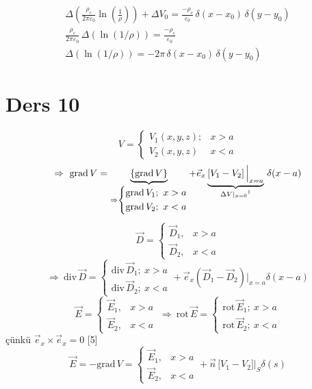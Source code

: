 \documentclass[11pt,a4paper]{article}
\begin{document}
\begin{gather*}
\Delta\left(\frac{\rho_c}{2\pi\varepsilon_0}\ln\left(\frac1\rho\right)\right)+\Delta V_0=\frac{-\rho_c}{\varepsilon_0}\,\delta(x-x_0)\,\delta(y-y_0)\\
\frac{\rho_c}{2\pi\varepsilon_0}\,\Delta\left(\ln(1/\rho)\right)=\frac{-\rho_c}{\varepsilon_0}\\
\Delta\left(\ln(1/\rho)\right)=-2\pi\,\delta(x-x_0)\,\delta(y-y_0)
\end{gather*}

\section{Ders 10}
\[ V=\begin{cases}V_1(x,y,z); & x>a\\ V_2(x,y,z) & x<a\end{cases} \]
\[ \Rightarrow\ \mathrm{grad}\,V=\underbrace{\{\mathrm{grad}\,V\}}_{\Rightarrow\left\{\begin{aligned}&\mathrm{grad}\,V_1;\ x>a\\&\mathrm{grad}\,V_2;\ x<a\end{aligned}\right.}+\vec e_x\underbrace{\left[V_1-V_2\right]\Big|_{x=a}}_{\Delta V|_{x=0}\text{\footnotemark}}\,\delta(x-a) \]
\[ \vec D=\begin{cases}\vec D_1, & x>a\\ \vec D_2, & x<a\end{cases} \]
\[ \Rightarrow\ \mathrm{div}\,\vec D=\begin{cases}\mathrm{div}\,\vec D_1;\ x>a\\ \mathrm{div}\,\vec D_2;\ x<a\end{cases}+\vec e_x(\vec D_1-\vec D_2)\Big|_{x=a}\delta(x-a) \]
\[ \vec E=\begin{cases}\vec E_1, & x>a\\ \vec E_2, & x<a\end{cases}\ \Rightarrow\ \mathrm{rot}\,\vec E=\begin{cases}\mathrm{rot}\,\vec E_1;\ x>a\\ \mathrm{rot}\,\vec E_2;\ x<a\end{cases} \]
çünkü $\vec e_x\times\vec e_x=0$
[5]
\[ \vec E=-\mathrm{grad}\,V=\begin{cases}\vec E_1, & x>a\\ \vec E_2, & x<a\end{cases}+\vec n\,\bigl[V_1-V_2\bigr]\Big|_S\delta(s) \]
\end{document}
